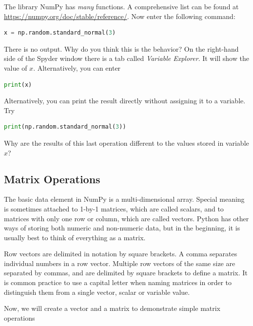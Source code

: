 \vs 

The library NumPy has \textit{many} functions. A comprehensive list can be found at \url{https://numpy.org/doc/stable/reference/}.  Now enter the following command: 

\begin{lstlisting}[language=Python]
	x = np.random.standard_normal(3)  
\end{lstlisting}

There is no output. Why do you think this is the behavior? \QA On the right-hand side of the Spyder window there is a tab called \textit{Variable Explorer}. It will show the value of $x$. Alternatively, you can enter 

\begin{lstlisting}[language=Python]
	print(x)
\end{lstlisting}

Alternatively, you can print the result directly without assigning it to a variable. Try

\begin{lstlisting}[language=Python]
	print(np.random.standard_normal(3))
\end{lstlisting}

Why are the results of this last operation different to the values stored in variable $x$? \QA



\subsection{Matrix Operations}

The basic data element in NumPy is a multi-dimensional array. 
Special meaning is sometimes attached to 1-by-1 matrices, which are
called scalars, and to matrices with only one row or column, which
are called vectors. Python has other ways of storing both numeric
and non-numeric data, but in the beginning, it is usually best to
think of everything as a matrix.

Row vectors are delimited in notation by square brackets. A comma separates individual numbers in a row vector. Multiple row vectors of the same size are separated by commas, and are delimited by square brackets to define a matrix. It is common practice to use a capital letter when naming matrices in order to distinguish them from a single vector, scalar or variable value. 

Now, we will create a vector and a matrix to demonstrate simple matrix operations \vs

